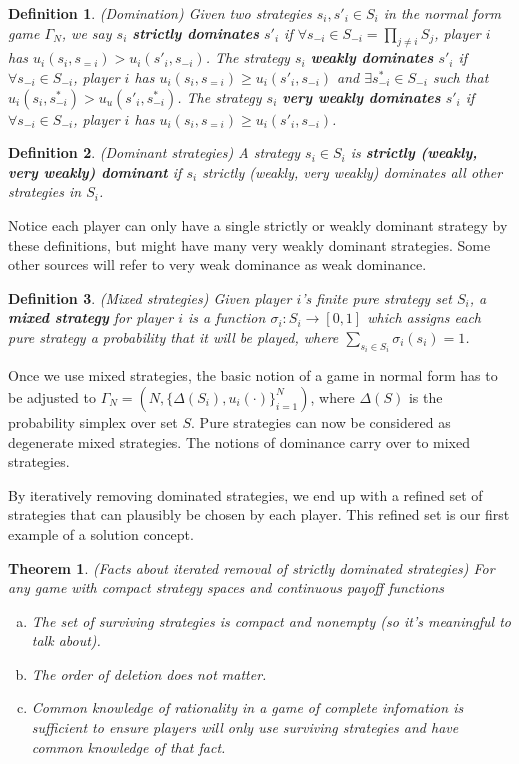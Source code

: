 \documentclass[letter, 10pt]{article}
\newtheorem{definition}{Definition}[section]
\newtheorem{theorem}{Theorem}[section]
\begin{document}
\begin{spacing}{1.1}
\begin{definition}
  (Domination) Given two strategies $s_i, s'_i \in S_i$ in the
  normal form game $\Gamma_N$, we say $s_i$ \textbf{strictly dominates}
  $s'_i$ if $\forall s_{-i} \in S_{-i} = \prod_{j\neq i} S_j$, player $i$ has
  $u_i(s_i,s_{=i}) > u_i(s'_i, s_{-i})$. The strategy $s_i$ \textbf{weakly
    dominates} $s'_i$ if $\forall s_{-i} \in S_{-i}$,
  player $i$ has $u_i(s_i,s_{=i}) \ge u_i(s'_i, s_{-i})$ and $\exists
  s^*_{-i} \in S_{-i}$ such that $u_i(s_i, s^*_{-i}) > u_u(s'_i,
  s^*_{-i})$. The strategy $s_i$ \textbf{very weakly
    dominates} $s'_i$ if $\forall s_{-i} \in S_{-i}$,
  player $i$ has $u_i(s_i,s_{=i}) \ge u_i(s'_i, s_{-i})$.
\end{definition}

\begin{definition}
  (Dominant strategies) A strategy $s_i \in S_i$ is \textbf{strictly
    (weakly, very weakly)
    dominant} if $s_i$ strictly (weakly, very weakly) dominates all other strategies in $S_i$.
\end{definition}

Notice each player can only have a single strictly or weakly dominant
strategy by these definitions, but might have many very weakly dominant
strategies. Some other sources will refer to very weak dominance as weak dominance.

\begin{definition}
  (Mixed strategies) Given player $i$'s finite pure
  strategy set $S_i$, a \textbf{mixed strategy} for player $i$ is
  a function $\sigma_i : S_i \to [0,1]$ which assigns
  each pure strategy a probability that it will be
  played, where $\sum_{s_i\in S_i} \sigma_i(s_i) = 1$.
\end{definition}

Once we use mixed strategies, the basic notion of a game in normal form has
to be adjusted to $\Gamma_N = \left(N, \{\Delta(S_i),
  u_i(\cdot)\}_{i=1}^N\right)$, where $\Delta(S)$ is the probability
simplex over set $S$. Pure strategies can now be considered as degenerate
mixed strategies. The notions of dominance carry over to mixed
strategies.

By iteratively removing dominated strategies, we end up with a refined set
of strategies that can plausibly be chosen by each player. This refined set
is our first example of a solution concept.

\begin{theorem}
  (Facts about iterated removal of strictly dominated strategies) For any
  game with compact strategy spaces and continuous payoff functions
  \begin{enumerate}[a)]
  \item The set of surviving strategies is compact and
    nonempty (so it's meaningful to talk about).
  \item The order of deletion does not matter.
  \item Common knowledge of rationality in a game of complete infomation is
    sufficient to ensure players will only use surviving strategies and
    have common knowledge of that fact.
  \end{enumerate}
\end{theorem}


\end{spacing}
\end{document}
